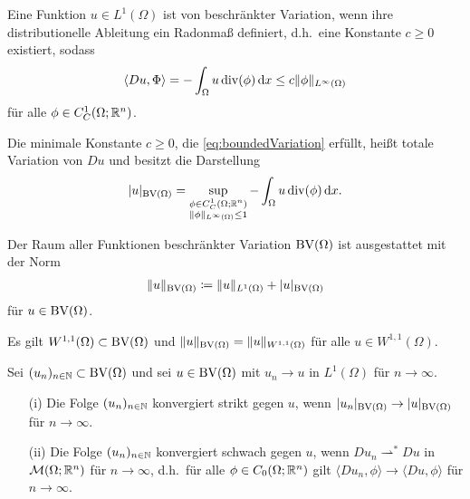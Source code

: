 \begin{definition}
  Eine Funktion $u\in L^1(\Omega)$ ist von beschränkter Variation, wenn ihre
  distributionelle Ableitung ein Radonmaß definiert, d.h.\ eine Konstante
  $c\geq 0$ existiert, sodass 
  \begin{align}
    \label{eq:boundedVariation}
    \langle Du,\Phi\rangle = - \int_\Omega u\operatorname{div} (\phi) \,\mathrm{d}x 
    \leq c\Vert\phi\Vert_{L^\infty(\Omega)}
  \end{align}
  für alle $\phi\in C^1_C(\Omega;\mathbb{R}^n)$.

  Die minimale Konstante $c\geq 0$, die \eqref{eq:boundedVariation} erfüllt,
  heißt totale Variation von $Du$ und besitzt die Darstellung
  \begin{align*}
    |u|_{\textup{BV}(\Omega)} = \sup_{\substack{\phi\in C^1_C(\Omega;\mathbb{R}^n)\\
    \Vert\phi\Vert_{L^\infty(\Omega)}\leq 1}}-\int_\Omega u\operatorname{div} (\phi)\,\mathrm{d}x.
  \end{align*}

  Der Raum aller Funktionen beschränkter Variation $\textup{BV}(\Omega)$
  ist ausgestattet mit der Norm 
  \begin{align*}
    \Vert u \Vert_{\textup{BV}(\Omega)} \coloneqq \Vert u\Vert_{L^1(\Omega)} +
    |u|_{\textup{BV}(\Omega)}
  \end{align*}
  für $u\in\textup{BV}(\Omega)$.
\end{definition}

\begin{remark}
  Es gilt $W^{1,1}(\Omega)\subset\textup{BV}(\Omega)$ und 
  $\Vert u \Vert_{\textup{BV}(\Omega)}=\Vert u \Vert_{W^{1,1}(\Omega)}$ für alle
  $u\in W^{1,1}(\Omega)$.
\end{remark}

\begin{definition}
  Sei $(u_n)_{n\in\mathbb{N}}\subset \textup{BV}(\Omega)$ und sei $u\in \textup{BV}(\Omega)$ mit
  $u_n\rightarrow u$ in $L^1(\Omega)$ für $n\rightarrow\infty$.
  \begin{itemize}
    \item[(i)]
      Die Folge $(u_n)_{n\in\mathbb{N}}$ konvergiert strikt gegen $u$,
      wenn $|u_n|_{\textup{BV}(\Omega)}\rightarrow |u|_{\textup{BV}(\Omega)}$ für $n\rightarrow\infty$.
    \item[(ii)] Die Folge $(u_n)_{n\in\mathbb{N}}$ konvergiert
      schwach gegen $u$, wenn
      $Du_n\rightharpoonup^\ast Du$ in 
      $\mathcal{M}(\Omega;\mathbb{R}^n)$ für $n\rightarrow\infty$, d.h.\ für alle
      $\phi\in C_0(\Omega;\mathbb{R}^n)$ gilt 
      $\langle Du_n,\phi\rangle\rightarrow \langle Du,\phi\rangle$ für 
      $n\rightarrow\infty$.
  \end{itemize}
\end{definition}

